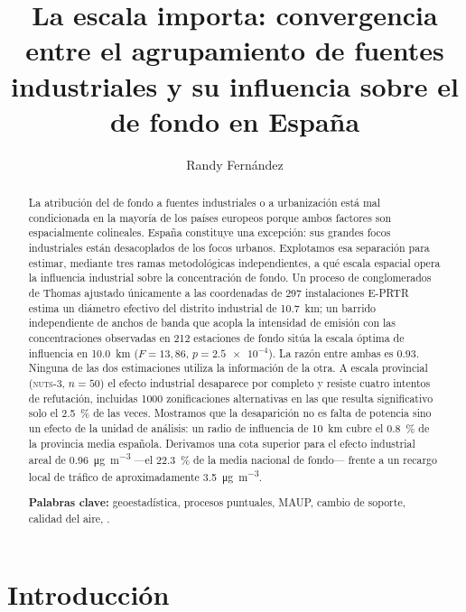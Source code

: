\documentclass[10pt,twocolumn,a4paper]{article}
\title{\bfseries La escala importa: convergencia entre el agrupamiento de
fuentes industriales y su influencia sobre el \ce{NO2} de fondo en España}
\author[ ]{Randy Fernández}
\affil[ ]{\small Máster en Ciencia de Datos \\
\texttt{randy.fernandez@example.com}}
\date{}
\newcommand{\ugm}{\si{\micro\gram\per\cubic\metre}}
\begin{document}
\maketitle

\begin{abstract}
\noindent
La atribución del  de fondo a fuentes industriales o a urbanización
está mal condicionada en la mayoría de los países europeos porque ambos
factores son espacialmente colineales. España constituye una excepción: sus
grandes focos industriales están desacoplados de los focos urbanos.
Explotamos esa separación para estimar, mediante tres ramas metodológicas
independientes, a qué escala espacial opera la influencia industrial sobre la
concentración de fondo. Un proceso de conglomerados de Thomas ajustado
únicamente a las coordenadas de \num{297} instalaciones E-PRTR estima un
diámetro efectivo del distrito industrial de \SI{10.7}{\kilo\metre}; un
barrido independiente de anchos de banda que acopla la intensidad de emisión
con las concentraciones observadas en \num{212} estaciones de fondo sitúa la
escala óptima de influencia en \SI{10.0}{\kilo\metre} ($F=13{,}86$,
$p=\num{2.5e-4}$). La razón entre ambas es \num{0.93}. Ninguna de las dos
estimaciones utiliza la información de la otra. A escala provincial
(\textsc{nuts}-3, $n=50$) el efecto industrial desaparece por completo y
resiste cuatro intentos de refutación, incluidas \num{1000} zonificaciones
alternativas en las que resulta significativo solo el \SI{2.5}{\percent} de
las veces. Mostramos que la desaparición no es falta de potencia sino un
efecto de la unidad de análisis: un radio de influencia de
\SI{10}{\kilo\metre} cubre el \SI{0.8}{\percent} de la provincia media
española. Derivamos una cota superior para el efecto industrial areal de
\SI{0.96}{\ugm} ---el \SI{22.3}{\percent} de la media nacional de fondo---
frente a un recargo local de tráfico de aproximadamente \SI{3.5}{\ugm}.

\medskip
\noindent\textbf{Palabras clave:} geoestadística, procesos puntuales, MAUP,
cambio de soporte, calidad del aire, .
\end{abstract}

\section{Introducción}
\end{document}

